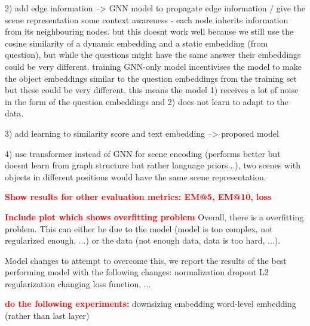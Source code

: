 2) add edge information --> GNN model to propagate edge information / give the scene representation some context awareness - each node inherits information from its neighbouring nodes. but this doesnt work well because we still use the cosine similarity of a dynamic embedding and a static embedding (from question), but while the questions might have the same answer their embeddings could be very different. training GNN-only model incentivises the model to make the object embeddings  similar to the question embeddings from the training set but these could be very different. this means the model 1) receives a lot of noise in the form of the question embeddings and 2) does not learn to adapt to the data.

3) add learning to similarity score and text embedding --> proposed model

4) use transformer instead of GNN for scene encoding (performs better but doesnt learn from graph structure but rather language priors...), two scenes with objects in different positions would have the same scene representation.


\textcolor{red}{\textbf{Show results for other evaluation metrics: EM@5, EM@10, loss}}


\textcolor{red}{\textbf{Include plot which shows overfitting problem}}
Overall, there is a overfitting problem. This can either be due to the model (model is too complex, not regularized enough, ...) or the data (not enough data, data is too hard, ...).

Model changes to attempt to overcome this, we report the results of the best performing model with the following changes: 
normalization
dropout
L2 regularization
changing loss function, ...

\textcolor{red}{\textbf{do the following experiments:}}
downsizing embedding
word-level embedding (rather than last layer)